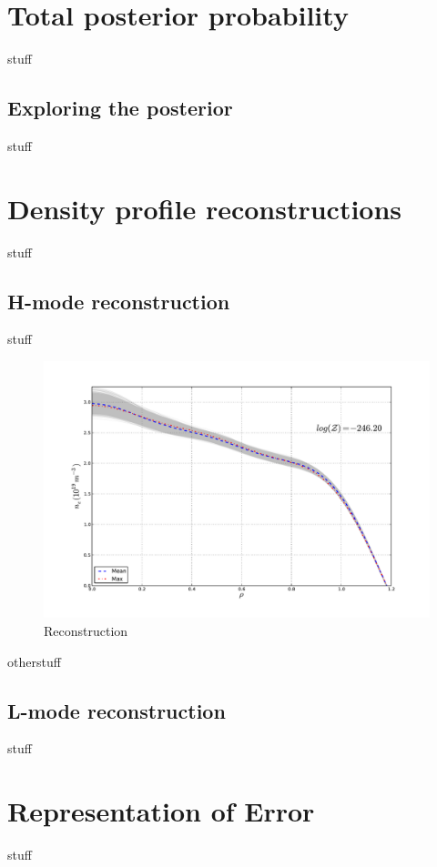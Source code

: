 \documentclass[12pt]{article}
\numberwithin{equation}{section}
\begin{document}
\section{Total posterior probability}
stuff
\subsection{Exploring the posterior}
stuff
\section{Density profile reconstructions}
stuff
\subsection{H-mode reconstruction}
stuff
\begin{figure}[ht]
	\centering
	\includegraphics[width=12cm,keepaspectratio=true]{figures/bfit146102_00505_all5}
	\vspace{-30pt}
	\caption{Reconstruction}
\end{figure}
otherstuff
\subsection{L-mode reconstruction}
stuff
\section{Representation of Error}
stuff
\end{document}
